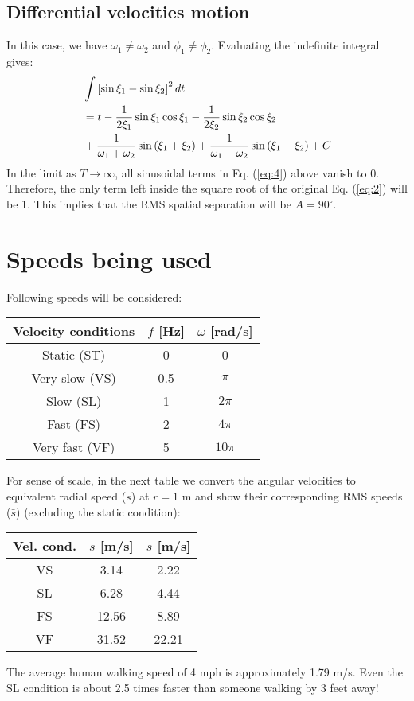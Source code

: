\documentclass[12pt]{article}
\begin{document}
\subsection{Differential velocities motion}
In this case, we have $\omega_1 \neq \omega_2$ and $\phi_1 \neq \phi_2$. Evaluating the indefinite integral gives:
\begin{align}\label{eq:4}
  & \int \left[\sin \xi_1 - \sin \xi_2\right]^2 dt \notag\\
  & = t - \frac{1}{2\xi_1}\sin\xi_1\cos\xi_1 - \frac{1}{2\xi_2}\sin\xi_2\cos\xi_2 \notag\\
  & + \frac{1}{\omega_1 + \omega_2}\sin{\left(\xi_1 + \xi_2\right)} + \frac{1}{\omega_1 - \omega_2}\sin{\left(\xi_1 - \xi_2\right)} + C
\end{align}
In the limit as $T \to \infty$, all sinusoidal terms in Eq. (\ref{eq:4}) above vanish to 0. Therefore, the only term left inside the square root of the original Eq. (\ref{eq:2}) will be 1. This implies that the RMS spatial separation will be $A = 90^{\circ}$.


\section{Speeds being used}
Following speeds will be considered:
\begin{table}[h!]
\centering
\begin{tabular}{ c | c | c }
  Velocity conditions & $f$ [Hz] & $\omega$ [rad/s] \\\hline
  Static (ST)    & 0   & 0\\
  Very slow (VS) & 0.5 & $\pi$\\
  Slow (SL)      & 1   & $2\pi$\\
  Fast (FS)      & 2   & $4\pi$\\
  Very fast (VF) & 5   & $10\pi$
\end{tabular}
\end{table}

For sense of scale, in the next table we convert the angular velocities to equivalent radial speed ($s$) at $r = 1$ m and show their corresponding RMS speeds ($\bar{s}$) (excluding the static condition):

\begin{table}[h!]
\centering
\begin{tabular}{ c | c | c }
  Vel. cond. & $s$ [m/s] & $\bar{s}$ [m/s] \\\hline
  VS &  3.14 & 2.22\\
  SL &  6.28 & 4.44\\
  FS & 12.56 & 8.89\\
  VF & 31.52 & 22.21
\end{tabular}
\end{table}
The average human walking speed of 4 mph is approximately 1.79 m/s. Even the SL condition is about 2.5 times faster than someone walking by 3 feet away!
\end{document}
